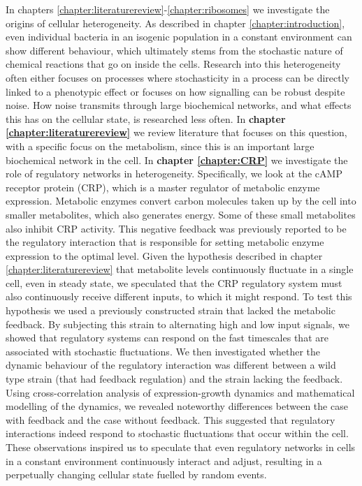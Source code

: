 In chapters \ref{chapter:literaturereview}-\ref{chapter:ribosomes} we investigate the origins of cellular heterogeneity.
%
As described in chapter \ref{chapter:introduction}, 
even individual bacteria in an isogenic population in a constant environment can show different behaviour,
which ultimately stems from the stochastic nature of 
chemical reactions that go on inside the cells.
%
Research into this heterogeneity often either focuses on processes where stochasticity in a process can be directly linked to a phenotypic effect
or focuses on how signalling can be robust despite noise.
%
How noise transmits through large biochemical networks, and what effects this has on the cellular state, is researched less often.
%
In
\textbf{chapter \ref{chapter:literaturereview}} we review literature that focuses on this question,
with a specific focus on the metabolism, 
since this 
is an important large biochemical network in the cell.
%
In \textbf{chapter \ref{chapter:CRP}} we investigate the role of regulatory networks in heterogeneity. %
%
Specifically, we look at the 
cAMP receptor protein (CRP), 
which is a master regulator of metabolic enzyme expression.
%
Metabolic enzymes convert carbon molecules taken up by the cell into smaller metabolites, 
which also generates energy. %
%
Some of these small metabolites also inhibit CRP activity.
This negative feedback was previously reported to be the regulatory interaction that is responsible for 
setting metabolic enzyme expression to the optimal level.
%
Given the hypothesis described in chapter \ref{chapter:literaturereview} that metabolite levels continuously fluctuate in a single cell, even in steady state, 
we speculated that the CRP regulatory system must also continuously receive different inputs, to which it might respond.
%
To test this hypothesis we used a previously constructed strain that lacked the metabolic feedback. %
By subjecting this strain to alternating high and low input signals, 
we showed that regulatory systems can respond on the fast timescales that are associated with stochastic fluctuations.
%
We then investigated whether the dynamic behaviour of the regulatory interaction was different 
between a wild type strain (that had feedback regulation) and the strain lacking the feedback.
%
Using cross-correlation analysis of expression-growth dynamics and mathematical modelling of the dynamics,
we revealed noteworthy differences between the case with feedback and the case without feedback.
%
This suggested that regulatory interactions indeed respond to stochastic fluctuations that occur within the cell.
%
These observations inspired us to speculate that 
even regulatory networks in cells in a constant environment 
continuously interact and adjust, 
resulting in a perpetually changing cellular state fuelled by random events.





